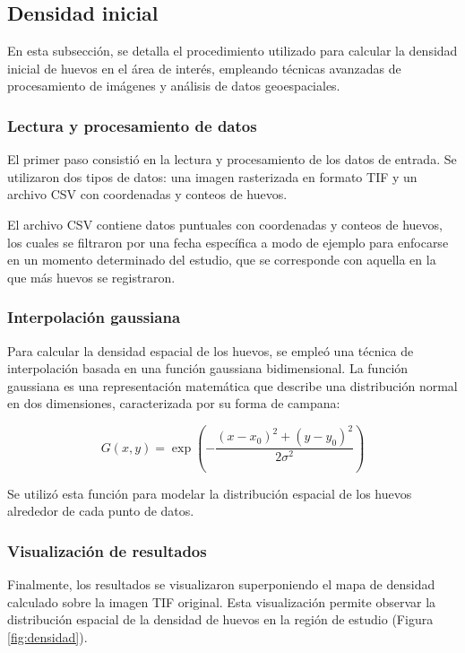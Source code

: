 \subsection{Densidad inicial}

En esta subsección, se detalla el procedimiento utilizado para calcular la densidad inicial de huevos en el área de interés, empleando técnicas avanzadas de procesamiento de imágenes y análisis de datos geoespaciales.

\subsubsection{Lectura y procesamiento de datos}

El primer paso consistió en la lectura y procesamiento de los datos de entrada. Se utilizaron dos tipos de datos: una imagen rasterizada en formato TIF y un archivo CSV con coordenadas y conteos de huevos.

El archivo CSV contiene datos puntuales con coordenadas y conteos de huevos, los cuales se filtraron por una fecha específica a modo de ejemplo para enfocarse en un momento determinado del estudio, que se corresponde con aquella en la que más huevos se registraron.

\subsubsection{Interpolación gaussiana}

Para calcular la densidad espacial de los huevos, se empleó una técnica de interpolación basada en una función gaussiana bidimensional. La función gaussiana es una representación matemática que describe una distribución normal en dos dimensiones, caracterizada por su forma de campana:

\begin{equation}
	G(x, y) = \exp\left(-\frac{(x - x_0)^2 + (y - y_0)^2}{2\sigma^2}\right)
\end{equation}

Se utilizó esta función para modelar la distribución espacial de los huevos alrededor de cada punto de datos. 

\subsubsection{Visualización de resultados}

Finalmente, los resultados se visualizaron superponiendo el mapa de densidad calculado sobre la imagen TIF original. Esta visualización permite observar la distribución espacial de la densidad de huevos en la región de estudio (Figura \ref{fig:densidad}).

